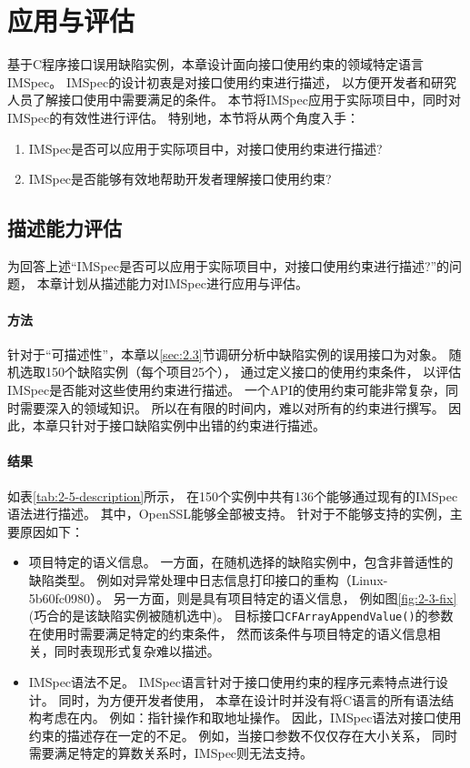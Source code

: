 \section{应用与评估}
\label{sec:2.5}
基于C程序接口误用缺陷实例，本章设计面向接口使用约束的领域特定语言IMSpec。
IMSpec的设计初衷是对接口使用约束进行描述，
以方便开发者和研究人员了解接口使用中需要满足的条件。
本节将IMSpec应用于实际项目中，同时对IMSpec的有效性进行评估。
特别地，本节将从两个角度入手：
\begin{enumerate}
	\item IMSpec是否可以应用于实际项目中，对接口使用约束进行描述?
	\item IMSpec是否能够有效地帮助开发者理解接口使用约束?
\end{enumerate}


\subsection{描述能力评估}
为回答上述“IMSpec是否可以应用于实际项目中，对接口使用约束进行描述?”的问题，
本章计划从描述能力对IMSpec进行应用与评估。

\paragraph{方法}
针对于“可描述性”，本章以\ref{sec:2.3}节调研分析中缺陷实例的误用接口为对象。
随机选取150个缺陷实例（每个项目25个），
通过定义接口的使用约束条件，
以评估IMSpec是否能对这些使用约束进行描述。
一个API的使用约束可能非常复杂，同时需要深入的领域知识。
所以在有限的时间内，难以对所有的约束进行撰写。
因此，本章只针对于接口缺陷实例中出错的约束进行描述。

\paragraph{结果}

如表\ref{tab:2-5-description}所示，
在150个实例中共有136个能够通过现有的IMSpec语法进行描述。
其中，OpenSSL能够全部被支持。
针对于不能够支持的实例，主要原因如下：
\begin{itemize}
	\item 项目特定的语义信息。
	一方面，在随机选择的缺陷实例中，包含非普适性的缺陷类型。
	例如对异常处理中日志信息打印接口的重构（Linux-5b60fc0980）。
	另一方面，则是具有项目特定的语义信息，
	例如图\ref{fig:2-3-fix}(巧合的是该缺陷实例被随机选中)。
	目标接口\texttt{CFArrayAppendValue()}的参数在使用时需要满足特定的约束条件，
	然而该条件与项目特定的语义信息相关，同时表现形式复杂难以描述。
	\item IMSpec语法不足。
	IMSpec语言针对于接口使用约束的程序元素特点进行设计。
	同时，为方便开发者使用，
	本章在设计时并没有将C语言的所有语法结构考虑在内。
	例如：指针操作和取地址操作。
	因此，IMSpec语法对接口使用约束的描述存在一定的不足。
	例如，当接口参数不仅仅存在大小关系，
	同时需要满足特定的算数关系时，IMSpec则无法支持。
\end{itemize}

